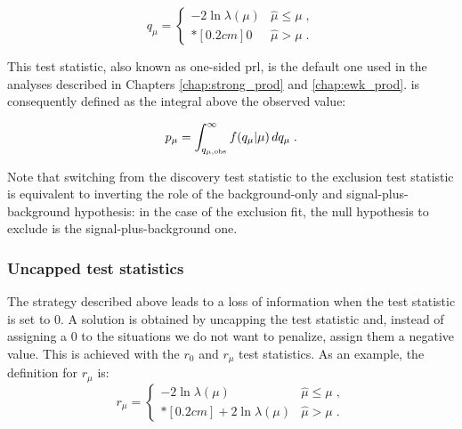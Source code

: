 \begin{equation}
\label{eq:stat:qmu}
q_{\mu} =
\left\{ \! \! \begin{array}{ll}
               - 2 \ln \lambda(\mu)  & \hat{\mu} \le \mu  \;, \\*[0.2 cm]
               0 & \hat{\mu} > \mu \;.
              \end{array}
       \right.
\end{equation}

\noindent This test statistic, also known as one-sided \gls{prl}, is the default one used in the analyses described in Chapters \ref{chap:strong_prod} and  \ref{chap:ewk_prod}. \pmu is consequently defined as the integral above the observed value: 

\begin{equation}
\label{eq:stat:pmu}
p_{\mu} = \int_{q_{\mu,{\rm obs}}}^{\infty} f(q_{\mu} | \mu ) \, d q_{\mu} \;.
\end{equation}

\noindent Note that switching from the discovery test statistic to the exclusion test statistic is equivalent to inverting the role of the background-only and signal-plus-background hypothesis: in the case of the exclusion fit, the null hypothesis to exclude is the signal-plus-background one.


\subsubsection*{Uncapped test statistics}

The strategy described above leads to a loss of information when the test statistic is set to 0. A solution is obtained by uncapping the test statistic and, instead of assigning a 0 to the situations we do not want to penalize, assign them a negative value. This is achieved with the $r_0$ and $r_\mu$ test statistics. As an example, the definition for $r_\mu$ is:
\begin{equation}
\label{eq:rmu}
r_{\mu} =
\left\{ \! \! \begin{array}{ll}
               - 2 \ln \lambda(\mu)  & \hat{\mu} \le \mu  \;, \\*[0.2 cm]
               + 2 \ln \lambda(\mu)  & \hat{\mu} > \mu  \;.
              \end{array}
       \right.
\end{equation}

